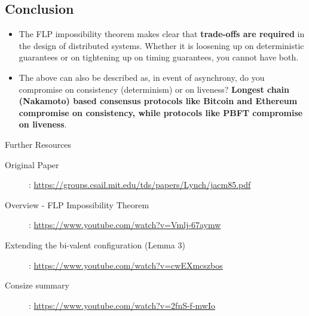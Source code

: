 \subsection{Conclusion}
\begin{itemize}
    \item The FLP impossibility theorem makes clear that \textbf{trade-offs are required} in the design of distributed systems. Whether it is loosening up on deterministic guarantees or on tightening up on timing guarantees, you cannot have both.
    \item The above can also be described as, in event of asynchrony, do you compromise on consistency (determinism) or on liveness? \textbf{Longest chain (Nakamoto) based consensus protocols like Bitcoin and Ethereum compromise on consistency, while protocols like PBFT compromise on liveness}.
\end{itemize}

\begin{refbox}{Further Resources}
    \small
    \begin{description}
        \item [Original Paper]: \href{https://groups.csail.mit.edu/tds/papers/Lynch/jacm85.pdf}{https://groups.csail.mit.edu/tds/papers/Lynch/jacm85.pdf}
        \item [Overview - FLP Impossibility Theorem]: \href{https://www.youtube.com/watch?v=Vmlj-67aymw}{https://www.youtube.com/watch?v=Vmlj-67aymw}
        \item [Extending the bi-valent configuration (Lemma 3)]: \href{https://www.youtube.com/watch?v=cwEXmcszbos}{https://www.youtube.com/watch?v=cwEXmcszbos}
        \item [Consize summary]: \href{https://www.youtube.com/watch?v=2fnS-f-mwIo}{https://www.youtube.com/watch?v=2fnS-f-mwIo}
    \end{description}
\end{refbox}